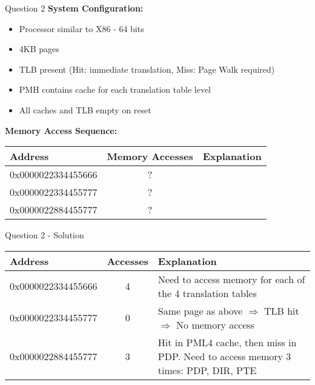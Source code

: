 \documentclass[aspectratio=169,12pt]{beamer}
\begin{document}
\begin{frame}{Question 2}
\textbf{System Configuration:}
\begin{itemize}
    \item Processor similar to X86 - 64 bits
    \item 4KB pages
    \item TLB present (Hit: immediate translation, Miss: Page Walk required)
    \item PMH contains cache for each translation table level
    \item All caches and TLB empty on reset
\end{itemize}

\vspace{1em}
\textbf{Memory Access Sequence:}
\begin{center}
\begin{tabular}{|l|c|l|}
\hline
\textbf{Address} & \textbf{Memory Accesses} & \textbf{Explanation} \\
\hline
0x0000022334455666 & ? & \\
0x0000022334455777 & ? & \\
0x0000022884455777 & ? & \\
\hline
\end{tabular}
\end{center}
\end{frame}

\begin{frame}{Question 2 - Solution}
\begin{center}
\begin{tabular}{|l|c|p{6cm}|}
\hline
\textbf{Address} & \textbf{Accesses} & \textbf{Explanation} \\
\hline
0x0000022334455666 & 4 & Need to access memory for each of the 4 translation tables \\
\hline
0x0000022334455777 & 0 & Same page as above $\Rightarrow$ TLB hit $\Rightarrow$ No memory access \\
\hline
0x0000022884455777 & 3 & Hit in PML4 cache, then miss in PDP. Need to access memory 3 times: PDP, DIR, PTE \\
\hline
\end{tabular}
\end{center}
\end{frame}
\end{document}
